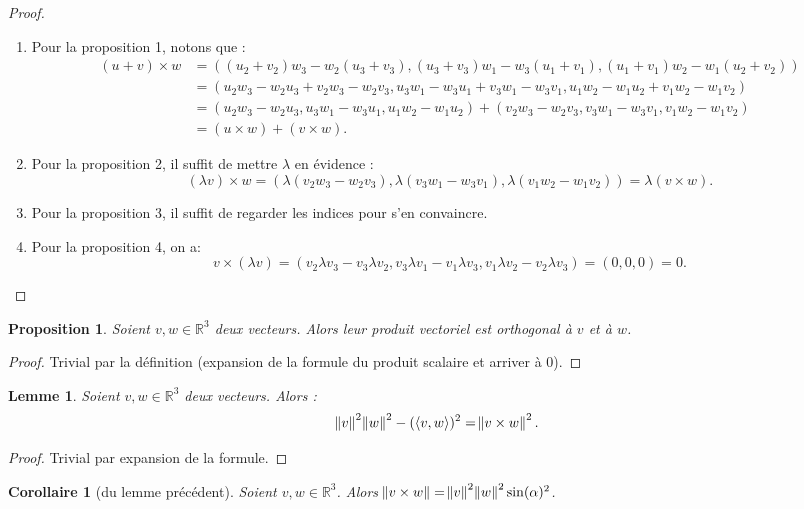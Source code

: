 \documentclass{article}
\newcommand{\R}{\mathbb R}
\newcommand{\scpr}[2]{\left\langle #1, #2\right\rangle}
\newtheorem{prp}[thm]{Proposition}
\newtheorem{cor}[thm]{Corollaire}
\newtheorem{lem}[thm]{Lemme}
\theoremstyle{definition}
\theoremstyle{remark}
\begin{document}
		\begin{proof}~
		\begin{enumerate}
			\item Pour la proposition 1, notons que :
			      \begin{align*}(u+v) \times w &= ((u_2+v_2)w_3 - w_2(u_3+v_3), (u_3+v_3)w_1 - w_3(u_1+v_1), (u_1+v_1)w_2 - w_1(u_2+v_2)) \\
			      	&= (u_2w_3-w_2u_3 + v_2w_3-w_2v_3, u_3w_1-w_3u_1 + v_3w_1-w_3v_1, u_1w_2-w_1u_2 + v_1w_2-w_1v_2) \\
			      	&= (u_2w_3-w_2u_3, u_3w_1-w_3u_1, u_1w_2-w_1u_2) + (v_2w_3-w_2v_3, v_3w_1-w_3v_1, v_1w_2-w_1v_2) \\
			      	&= (u \times w) + (v \times w).
			      \end{align*}
			\item Pour la proposition 2, il suffit de mettre $\lambda$ en évidence :
			      \[(\lambda v) \times w = (\lambda(v_2w_3-w_2v_3), \lambda(v_3w_1-w_3v_1), \lambda(v_1w_2-w_1v_2)) = \lambda(v \times w).\]
			\item Pour la proposition 3, il suffit de regarder les indices pour s'en convaincre.
			\item Pour la proposition 4, on a:
			      \[v \times (\lambda v) = (v_2\lambda v_3-v_3\lambda v_2, v_3\lambda v_1-v_1\lambda v_3, v_1\lambda v_2-v_2\lambda v_3) = (0, 0, 0) = 0.\]
		\end{enumerate}
		\end{proof}

		\begin{prp} Soient $v, w \in \R^3$ deux vecteurs. Alors leur produit vectoriel est orthogonal à $v$ et à $w$. \end{prp}

		\begin{proof} Trivial par la définition (expansion de la formule du produit scalaire et arriver à 0). \end{proof}

		\begin{lem}\label{prodsVecSc} Soient $v, w \in \R^3$ deux vecteurs. Alors :\[\norm v^2\norm w^2 - (\scpr vw)^2 = \norm{v \times w}^2.\] \end{lem}
		
		\begin{proof} Trivial par expansion de la formule. \end{proof}

		\begin{cor}[du lemme précédent] Soient $v, w \in \R^3$. Alors $\norm {v \times w} = \norm v^2\norm w^2\sin(\alpha)^2$. \end{cor}
\end{document}

